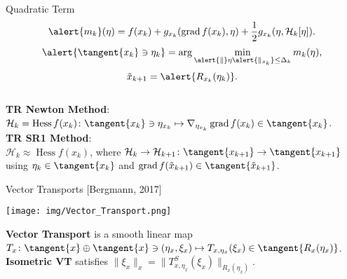 \documentclass{beamer}
\begin{document}
\begin{frame}{Quadratic Term}
	\begin{equation*}
		\alert{m_k}(\eta) = f(x_k) + g_{x_k}(\operatorname{grad}f(x_k), \eta) + \frac{1}{2} g_{x_k}(\eta, \mathcal{H}_k [\eta]).
	\end{equation*} 
    \begin{equation*}
        \alert{\tangent{x_k} \ni \eta_k} = \arg \min_{\alert{\lVert} \eta \alert{\rVert_{x_k}} \leq \Delta_k} m_k(\eta),
    \end{equation*}
    \begin{equation*}
        \tilde{x}_{k+1} = \alert{R_{x_k}(\eta_k)}.
    \end{equation*} \\[0.5\baselineskip]
    \textbf{TR Newton Method}: \\
    $\mathcal{H}_k = \operatorname{Hess} f(x_k) \colon \tangent{x_k} \ni \eta_{x_k} \mapsto \nabla_{\eta_{x_k}} \operatorname{grad} f(x_k) \in \tangent{x_k}$. \\[0.5\baselineskip]
	\textbf{TR SR1 Method}: \\
    $\mathcal{H}_k \approx \operatorname{Hess} f(x_k)$, where $\mathcal{H}_k \rightarrow \mathcal{H}_{k+1} \colon \tangent{x_{k+1}} \to \tangent{x_{k+1}}$ using $\eta_k \in \tangent{x_k}$ and $\operatorname{grad}f(\tilde{x}_{k+1}) \in \tangent{\tilde{x}_{k+1}}$.
\end{frame}

\begin{frame}{Vector Transports}
    \vspace{-1\baselineskip}\hfill{\tiny{[Bergmann, 2017]}}
    \begin{center}
        \texttt{[image: img/Vector\_Transport.png]}
    \end{center}
    \textbf{Vector Transport} is a smooth linear map $T_x \colon \tangent{x} \oplus \tangent{x} \ni (\eta_x, \xi_x) \mapsto T_{x, \eta_x}(\xi_x) \in \tangent{R_x(\eta_x)}$. \\[0.2\baselineskip]
    \textbf{Isometric VT} satisfies $\lVert \xi_x \rVert_x = \lVert T^{S}_{x, \eta_x}(\xi_x) \rVert_{R_x(\eta_x)}$.
\end{frame}
\end{document}
